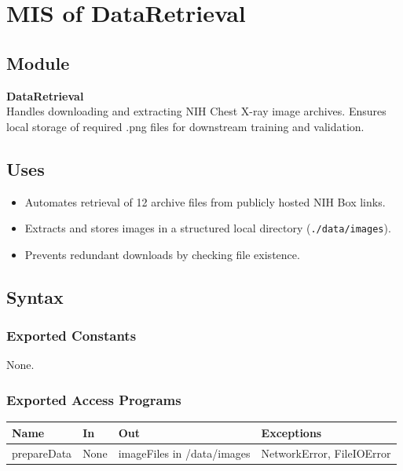 \documentclass[12pt, titlepage]{article}
\begin{document}
\section{MIS of DataRetrieval}

\subsection{Module}
\textbf{DataRetrieval} \\
Handles downloading and extracting NIH Chest X-ray image archives. Ensures local storage of required .png files for downstream training and validation.

\subsection{Uses}
\begin{itemize}
    \item Automates retrieval of 12 archive files from publicly hosted NIH Box links.
    \item Extracts and stores images in a structured local directory (\texttt{./data/images}).
    \item Prevents redundant downloads by checking file existence.
\end{itemize}

\subsection{Syntax}

\subsubsection{Exported Constants}
None.

\subsubsection{Exported Access Programs}

\begin{center}
  \begin{tabular}{|p{4cm}|p{4cm}|p{4cm}|}
    \hline
    \textbf{Name} & \textbf{In} & \textbf{Out} & \textbf{Exceptions} \\
    \hline
    prepareData & None & imageFiles in /data/images & NetworkError, FileIOError \\
    \hline
  \end{tabular}
\end{center}
\end{document}

